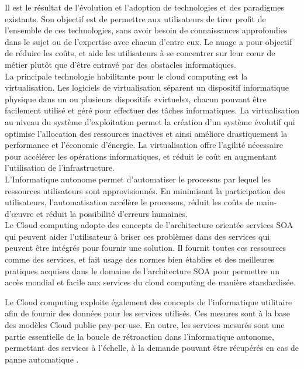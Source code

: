                 Il est le résultat de l'évolution et l'adoption de technologies et des paradigmes existants. Son objectif est de permettre aux utilisateurs de tirer profit de l'ensemble de ces technologies, sans avoir besoin de connaissances approfondies dans le  sujet ou de l'expertise avec chacun d'entre eux. Le nuage a pour objectif de réduire les coûts, et aide les utilisateurs à se concentrer sur leur cœur de métier plutôt que d'être entravé par des obstacles informatiques. \\

                La principale technologie habilitante pour le cloud computing est la virtualisation. Les logiciels de virtualisation séparent un dispositif informatique physique dans un ou plusieurs dispositifs «virtuels», chacun pouvant être facilement utilisé et géré pour effectuer des tâches informatiques. La virtualisation au niveau du système d'exploitation permet la création d’un système évolutif qui optimise l’allocation des ressources inactives et ainsi améliore drastiquement la performance et l’économie d’énergie. La virtualisation offre l'agilité nécessaire pour accélérer les opérations informatiques, et réduit le coût en augmentant l'utilisation de l'infrastructure.\\
                L’Informatique autonome permet d’automatiser le processus par lequel les ressources utilisateurs sont approvisionnés. En minimisant la participation des utilisateurs, l’automatisation accélère le processus, réduit les coûts de main-d'œuvre et réduit la possibilité d'erreurs humaines.\\


                Le Cloud computing adopte des concepts de l'architecture orientée services SOA qui peuvent aider l'utilisateur à briser ces problèmes dans des services qui peuvent être intégrés pour fournir une solution. Il fournit toutes ces ressources comme des services, et fait usage des normes bien établies et des meilleures pratiques acquises dans le domaine de l'architecture SOA pour permettre un accès mondial et facile aux services du cloud computing de manière standardisée.

                Le Cloud computing exploite également des concepts de l'informatique utilitaire afin de fournir des données pour les services utilisés. Ces mesures sont à la base des modèles Cloud public pay-per-use. En outre, les services mesurés sont une partie essentielle de la boucle de rétroaction dans l'informatique autonome, permettant des services à l'échelle, à la demande pouvant être récupérés en cas de panne  automatique .\\

